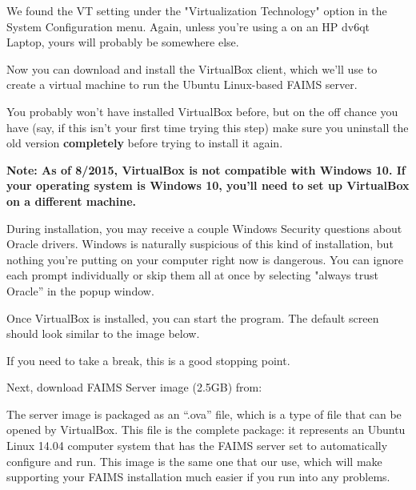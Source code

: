 We found the VT setting under the "Virtualization Technology" option in the System Configuration menu. Again, unless you're using a on an HP dv6qt Laptop, yours will probably be somewhere else.


Now you can download and install the VirtualBox client, which we'll use to create a virtual machine to run the Ubuntu Linux-based FAIMS server.

\from[url3]

You probably won't have installed VirtualBox before, but on the off chance you have (say, if this isn't your first time trying this step) make sure you uninstall the old version {\bf completely} before trying to install it again.

{\bf Note: As of 8/2015, VirtualBox is not compatible with Windows 10. If your operating system is Windows 10, you'll need to set up VirtualBox on a different machine.}

During installation, you may receive a couple Windows Security questions about Oracle drivers. Windows is naturally suspicious of this kind of installation, but nothing you're putting on your computer right now is dangerous. You can ignore each prompt individually or skip them all at once by selecting "always trust Oracle” in the popup window.

{}

Once VirtualBox is installed, you can start the program. The default screen should look similar to the image below.

{}

If you need to take a break, this is a good stopping point.

Next, download FAIMS Server image (2.5GB) from: \from[url4]

The server image is packaged as an “.ova” file, which is a type of file that can be opened by VirtualBox. This file is the complete package: it represents an Ubuntu Linux 14.04 computer system that has the FAIMS server set to automatically configure and run. This image is the same one that our \from[url5] use, which will make supporting your FAIMS installation much easier if you run into any problems.

